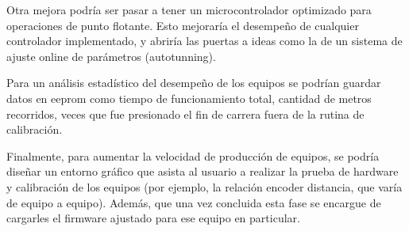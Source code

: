 Otra mejora podría ser pasar a tener un microcontrolador optimizado para operaciones de punto flotante. Esto mejoraría el desempeño de cualquier controlador implementado, y abriría las puertas a ideas como la de un sistema de ajuste online de parámetros (autotunning).

Para un análisis estadístico del desempeño de los equipos se podrían guardar datos en eeprom como tiempo de funcionamiento total, cantidad de metros recorridos, veces que fue presionado el fin de carrera fuera de la rutina de calibración.

Finalmente, para aumentar la velocidad de producción de equipos, se podría diseñar un entorno gráfico que asista al usuario a realizar la prueba de hardware y calibración de los equipos (por ejemplo, la relación encoder distancia, que varía de equipo a equipo). Además, que una vez concluida esta fase se encargue de cargarles el firmware ajustado para ese equipo en particular.



